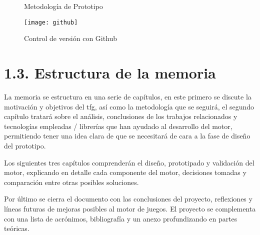 \begin{figure}[h!]
    \centering
    \caption{Metodología de Prototipo}
    \label{prototype_methodology}
\end{figure}

\begin{figure}[h!]
    \centering
    \texttt{[image: github]}
    \caption{Control de versión con Github}
    \label{github_tool}
\end{figure}

\clearpage

\section*{1.3. Estructura de la memoria}\label{sec:structure}

La memoria se estructura en una serie de capítulos, en este primero se discute la motivación y objetivos del \gls{tfg},
así como la metodología que se seguirá, el segundo capítulo tratará sobre el análisis, conclusiones de los trabajos
relacionados y tecnologías empleadas / librerías que han ayudado al desarrollo del motor, permitiendo tener una idea clara
de que se necesitará de cara a la fase de diseño del prototipo.

Los siguientes tres capítulos comprenderán el diseño, prototipado y validación del motor, explicando en detalle cada
componente del motor, decisiones tomadas y comparación entre otras posibles soluciones.

Por último se cierra el documento con las conclusiones del proyecto, reflexiones y líneas futuras de mejoras posibles
al motor de juegos. El proyecto se complementa con una lista de acrónimos, bibliografía y un anexo profundizando en partes teóricas.
